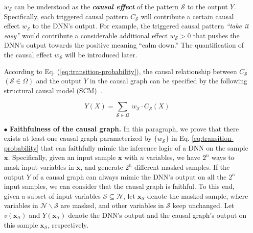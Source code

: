 \documentclass[10pt,twocolumn,letterpaper]{article}
\begin{document}
{\small$w_{\mathcal{S}}$} can be understood as the \textit{\textbf{causal effect}} of the pattern {\small$\mathcal{S}$} to the output {\small$Y$}.
Specifically, each triggered causal pattern {\small$C_{\mathcal{S}}$} will contribute a certain causal effect {\small$w_{\mathcal{S}}$} to the DNN’s output.
For example, the triggered causal pattern \textit{``take it easy''} would contribute a considerable additional effect {\small$w_{\mathcal{S}}\!>\!0$} that pushes the DNN's output towards the positive meaning ``calm down.''
The quantification of the causal effect {\small$w_{\mathcal{S}}$} will be introduced later.


According to Eq. (\ref{eq:transition-probability}), the causal relationship between {\small$C_{\mathcal{S}}$} {\small$(\mathcal{S}\in\Omega)$} and the output {\small$Y$} in the causal graph can be specified by the following structural causal model (SCM)~\cite{pearl2009causality}.


\begin{small}
\begin{equation}
    Y(X)={\sum}_{\mathcal{S}\in\Omega}\ w_{\mathcal{S}}\cdot C_{\mathcal{S}}(X)
    \label{eq:scm}
\end{equation}
\end{small}


$\bullet$ \textbf{Faithfulness of the causal graph.}
In this paragraph, we prove that there exists at least one causal graph parameterized by {\small $\{w_\mathcal{S}\}$} in Eq. \eqref{eq:transition-probability} that can faithfully mimic the inference logic of a DNN on the sample {\small$\boldsymbol{x}$}.
Specifically, given an input sample {\small$\boldsymbol{x}$} with {\small$n$} variables, we have {\small$2^n$} ways to mask input variables in {\small$\boldsymbol{x}$}, and generate {\small$2^n$} different masked samples.
If the output {\small$Y$} of a causal graph can always mimic the DNN's output on all the {\small$2^n$} input samples, we can consider that the causal graph is faithful.
To this end, given a subset of input variables {\small$\mathcal{S}\!\subseteq\!\mathcal{N}$}, let {\small$\boldsymbol{x}_{\mathcal{S}}$} denote the masked sample, where variables in {\small$\mathcal{N}\backslash\mathcal{S}$} are masked, and other variables in {\small$\mathcal{S}$} keep unchanged.
Let {\small$v(\boldsymbol{x}_{\mathcal{S}})$} and {\small$Y(\boldsymbol{x}_{\mathcal{S}})$} denote the DNN's output and the causal graph's output on this sample {\small$\boldsymbol{x}_{\mathcal{S}}$}, respectively.
\end{document}
